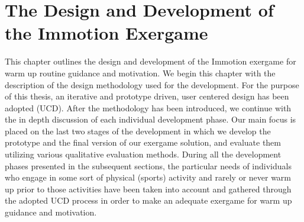 \chapter{The Design and Development of the Immotion Exergame}\label{chapter:implementation}

This chapter outlines the design and development of the Immotion exergame for warm up routine guidance and motivation. We begin this chapter with the description of the design methodology used for the development. For the purpose of this thesis, an iterative and prototype driven, user centered design has been adopted (UCD). After the methodology has been introduced, we continue with the in depth discussion of each individual development phase. Our main focus is placed on the last two stages of the development in which we develop the prototype and the final version of our exergame solution, and evaluate them utilizing various qualitative evaluation methods. During all the development phases presented in the subsequent sections, the particular needs of individuals who engage in some sort of physical (sports) activity and rarely or never warm up prior to those activities have been taken into account and gathered through the adopted UCD process in order to make an adequate exergame for warm up guidance and motivation. %

